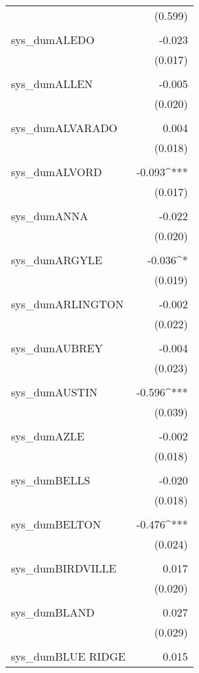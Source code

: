 \begin{table}[!htbp]
\begin{tabular}{@{\extracolsep{5pt}}lD{.}{.}{-3} }
  & (0.599) \\ 
  & \\ 
 sys\_dumALEDO & -0.023 \\ 
  & (0.017) \\ 
  & \\ 
 sys\_dumALLEN & -0.005 \\ 
  & (0.020) \\ 
  & \\ 
 sys\_dumALVARADO & 0.004 \\ 
  & (0.018) \\ 
  & \\ 
 sys\_dumALVORD & -0.093^{***} \\ 
  & (0.017) \\ 
  & \\ 
 sys\_dumANNA & -0.022 \\ 
  & (0.020) \\ 
  & \\ 
 sys\_dumARGYLE & -0.036^{*} \\ 
  & (0.019) \\ 
  & \\ 
 sys\_dumARLINGTON & -0.002 \\ 
  & (0.022) \\ 
  & \\ 
 sys\_dumAUBREY & -0.004 \\ 
  & (0.023) \\ 
  & \\ 
 sys\_dumAUSTIN & -0.596^{***} \\ 
  & (0.039) \\ 
  & \\ 
 sys\_dumAZLE & -0.002 \\ 
  & (0.018) \\ 
  & \\ 
 sys\_dumBELLS & -0.020 \\ 
  & (0.018) \\ 
  & \\ 
 sys\_dumBELTON & -0.476^{***} \\ 
  & (0.024) \\ 
  & \\ 
 sys\_dumBIRDVILLE & 0.017 \\ 
  & (0.020) \\ 
  & \\ 
 sys\_dumBLAND & 0.027 \\ 
  & (0.029) \\ 
  & \\ 
 sys\_dumBLUE RIDGE & 0.015 \\ 

\end{tabular}
\end{table}
